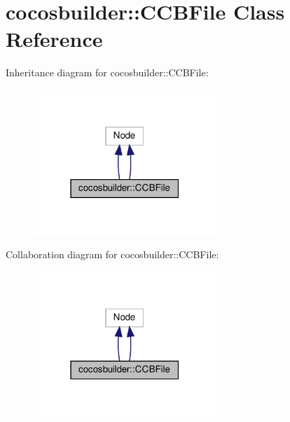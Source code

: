 \hypertarget{classcocosbuilder_1_1CCBFile}{}\section{cocosbuilder\+:\+:C\+C\+B\+File Class Reference}
\label{classcocosbuilder_1_1CCBFile}


Inheritance diagram for cocosbuilder\+:\+:C\+C\+B\+File\+:
\nopagebreak
\begin{figure}[H]
\begin{center}
\leavevmode
\includegraphics[width=195pt]{classcocosbuilder_1_1CCBFile__inherit__graph}
\end{center}
\end{figure}


Collaboration diagram for cocosbuilder\+:\+:C\+C\+B\+File\+:
\nopagebreak
\begin{figure}[H]
\begin{center}
\leavevmode
\includegraphics[width=195pt]{classcocosbuilder_1_1CCBFile__coll__graph}
\end{center}
\end{figure}
